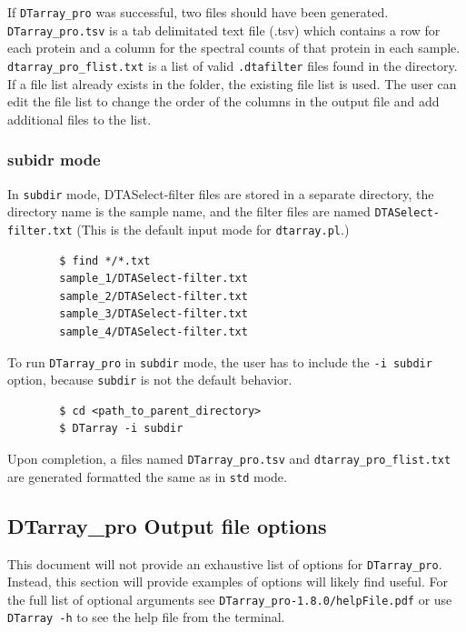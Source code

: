 \documentclass[12pt]{article}
\newcommand{\VERSION}{1.8.0}
\begin{document}
	\noindent
	If \texttt{DTarray\_pro} was successful, two files should have been generated.  \texttt{DTarray\_pro.tsv} is a tab delimitated text file (.tsv) which contains a row for each protein and a column for the spectral counts of that protein in each sample.  \texttt{dtarray\_pro\_flist.txt} is a list of valid \texttt{.dtafilter} files found in the directory.  If a file list already exists in the folder, the existing file list is used.  The user can edit the file list to change the order of the columns in the output file and add additional files to the list.  
	
	\pagebreak
	\subsubsection{subidr mode}
	
	In \texttt{subdir} mode, DTASelect-filter files are stored in a separate directory, the directory name is the sample name, and the filter files are named \texttt{DTASelect-filter.txt} (This is the default input mode for \texttt{dtarray.pl}.)
	
	\begin{lstlisting}
		$ find */*.txt
		sample_1/DTASelect-filter.txt
		sample_2/DTASelect-filter.txt
		sample_3/DTASelect-filter.txt
		sample_4/DTASelect-filter.txt
	\end{lstlisting}
	
	\noindent
	To run \texttt{DTarray\_pro} in \texttt{subdir} mode, the user has to include the \texttt{-i subdir} option, because \texttt{subdir} is not the default behavior.  
	
	\begin{lstlisting}
		$ cd <path_to_parent_directory>
		$ DTarray -i subdir
	\end{lstlisting}
	
	\noindent
	Upon completion, a files named \texttt{DTarray\_pro.tsv} and \texttt{dtarray\_pro\_flist.txt} are generated formatted the same as in \texttt{std} mode.
	
	\subsection{DTarray\_pro Output file options}
	
	This document will not provide an exhaustive list of options for \texttt{DTarray\_pro}. Instead, this section will provide examples of options will likely find useful.  For the full list of optional arguments see \texttt{DTarray\_pro-\VERSION/helpFile.pdf} or use \texttt{DTarray -h} to see the help file from the terminal.
	
\end{document}
